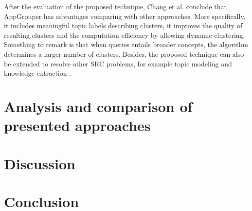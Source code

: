 \documentclass[runningheads]{llncs}
\begin{document}
After the evaluation of the proposed technique, Chang et al. \cite{Chang} conclude that AppGrouper has advantages comparing with other approaches. More specifically, it includes meaningful topic labels describing clusters, it improves the quality of resulting clusters and the computation efficiency by allowing dynamic clustering. Something to remark is that when queries entails broader concepts, the algorithm determines a larger number of clusters. Besides, the proposed technique can also be extended to resolve other SRC problems, for example topic modeling and knowledge extraction \cite{Chang}.

\section{Analysis and comparison of presented approaches} \label{analysis}

\section{Discussion} \label{discussion}
\section{Conclusion} \label{conclusion}
\end{document}
